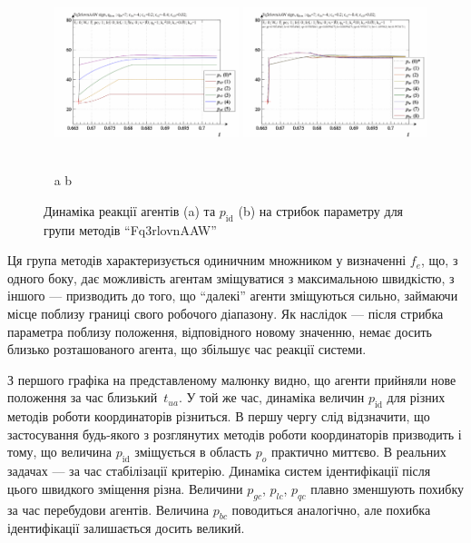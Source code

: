 \begin{figure}[htb!]
  \begin{center}
    ~ \hfill
    \includegraphics[width=0.48\textwidth]{p/sign/qls-p_t_pi_m_Fq3rlovnAAW_sign.png}
    \hfill
    \includegraphics[width=0.48\textwidth]{p/sign/qls-p_t_p_m_Fq3rlovnAAW_sign.png}
    \hfill ~
  \end{center}
  \vspace{-1.0ex}
  \begin{center}
    ~ \hfill a \hfill\hfill b  \hfill ~
  \end{center}
  \vspace{-1.5ex}
  \caption{Динаміка реакції агентів (a) та $p_\mathrm{id}$ (b) на стрибок параметру для групи методів ``Fq3rlovnAAW''}
  \label{atu:f:Fq3rlovnAAW_sign}
\end{figure}

Ця група методів характеризується одиничним множником у визначенні $f_e$, що,
з одного боку, дає можливість агентам зміщуватися з максимальною швидкістю, з
іншого --- призводить до того, що ``далекі'' агенти зміщуються сильно,
займаючи місце поблизу границі свого робочого діапазону. Як наслідок --- після
стрибка параметра поблизу положення, відповідного новому значенню, немає
досить близько розташованого агента, що збільшує час реакції системи.

З першого графіка на представленому малюнку видно, що агенти
прийняли нове положення за час близький~$t_{ua}$.
У той же час, динаміка величин
$ p_\mathrm{id} $ для різних методів роботи координаторів різниться. В
першу чергу слід відзначити, що застосування будь-якого з
розглянутих методів роботи координаторів призводить і тому,
що величина
$ p_\mathrm{id} $ зміщується в область
$ p_o $ практично миттєво. В реальних задачах --- за час стабілізації
критерію. Динаміка систем ідентифікації після цього швидкого
зміщення різна. Величини
$ p_{gc} $,
$ p_{lc} $,
$ p_{qc} $ плавно зменшують похибку за час перебудови
агентів. Величина
$ p_{bc} $ поводиться аналогічно, але похибка ідентифікації
залишається досить великий.


